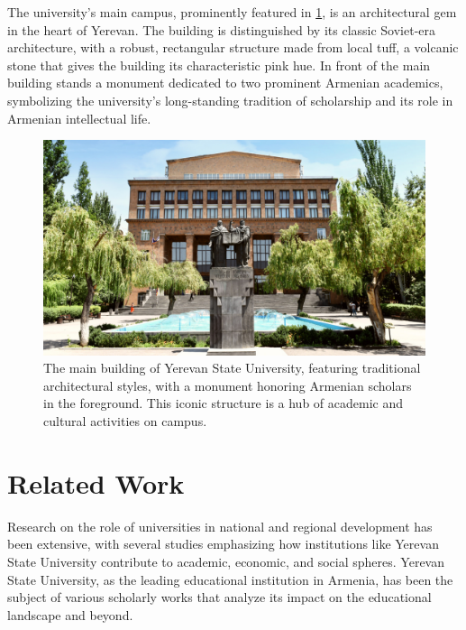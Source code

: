 \documentclass[12pt,onecolumn]{article}
\begin{document}
The university’s main campus, prominently featured in \cref{fig:teaser-image}, is an architectural gem in the heart of Yerevan. The building is distinguished by its classic Soviet-era architecture, with a robust, rectangular structure made from local tuff, a volcanic stone that gives the building its characteristic pink hue. In front of the main building stands a monument dedicated to two prominent Armenian academics, symbolizing the university's long-standing tradition of scholarship and its role in Armenian intellectual life.

\begin{figure}[h]
    \centering
    \includegraphics[width=\linewidth]{figures/ysu.jpeg}
    \caption{The main building of Yerevan State University, featuring traditional architectural styles, with a monument honoring Armenian scholars in the foreground. This iconic structure is a hub of academic and cultural activities on campus.
    }
    \label{fig:teaser-image}
\end{figure}


\clearpage
\section{Related Work}

Research on the role of universities in national and regional development has been extensive, with several studies emphasizing how institutions like Yerevan State University contribute to academic, economic, and social spheres. Yerevan State University, as the leading educational institution in Armenia, has been the subject of various scholarly works that analyze its impact on the educational landscape and beyond.
\end{document}
